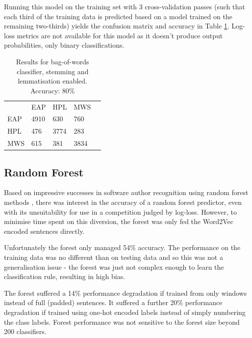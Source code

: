 Running this model on the training set with 3 cross-validation passes (such that each third of the training data is predicted based on a model trained on the remaining two-thirds) yields the confusion matrix and accuracy in Table \ref{tab:bow_cw}. Log-loss metrics are not available for this model as it doesn't produce output probabilities, only binary classifications.

\begin{table}[h]
\centering
\begin{tabular}{m{1cm}|m{1cm}|m{1cm}|m{1cm}|m{0cm}}
\multicolumn{1}{m{1cm}}{} & \multicolumn{1}{m{1cm}}{EAP} & \multicolumn{1}{m{1cm}}{HPL} & \multicolumn{1}{m{1cm}}{MWS} &\\[5pt]
\cline{2-4}
EAP & 4910 & 630 & 760 & \\[5pt]
\cline{2-4}
HPL & 476 & 3774 & 283 & \\[5pt]
\cline{2-4}
MWS & 615 & 381 & 3834 & \\[5pt]
\cline{2-4}
\end{tabular}
\caption{Results for bag-of-words classifier, stemming and lemmatisation enabled.\\Accuracy: 80\%}
\label{tab:bow_cw}
\end{table}

\subsection{Random Forest}
\label{sec:forest}

Based on impressive successes in software author recognition using random forest
methods \cite{c3}, there was interest in the accuracy of a random forest
predictor, even with its unsuitability for use in a competition judged by
log-loss. However, to minimise time spent on this diversion, the forest was only
fed the Word2Vec encoded sentences directly.

Unfortunately the forest only managed 54\% accuracy. The performance
on the training data was no different than on testing data and so this was not a
generalisation issue - the forest was just not complex enough to learn the
classification rule, resulting in high bias.

The forest suffered a 14\% performance degradation if trained from only windows
instead of full (padded) sentences. It suffered a further 20\% performance
degradation if trained using one-hot encoded labels instead of simply numbering
the class labels. Forest performance was not sensitive to the forest size beyond
200 classifiers. 


